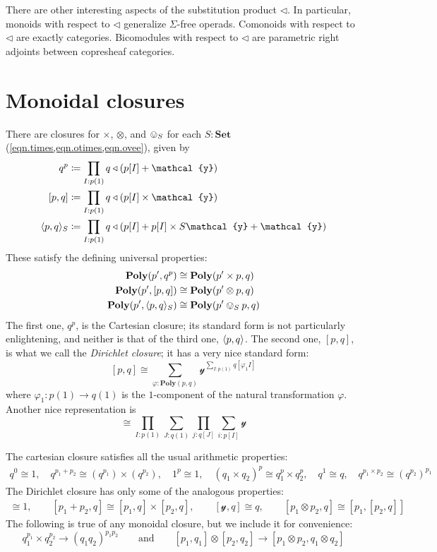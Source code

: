 \documentclass[11pt, one side, article]{memoir}
\theoremstyle{definition}
\theoremstyle{plain}
\DeclarePairedDelimiter{\present}{\langle}{\rangle}
\newcommand{\Cat}[1]{\mathbf{#1}}%
\newcommand{\smset}{\Cat{Set}}
\newcommand{\yon}{\mathcal{y}}
\newcommand{\poly}{\Cat{Poly}}
\newcommand{\0}{\textsf{0}}
\newcommand{\1}{\tn{\textsf{1}}}
\newcommand{\tri}{\mathbin{\triangleleft}}
\newcommand{\qqand}{\qquad\text{and}\qquad}
\begin{document}
There are other interesting aspects of the substitution product $\tri$. In particular, monoids with respect to $\tri$ generalize $\Sigma$-free operads. Comonoids with respect to $\tri$ are exactly categories. Bicomodules with respect to $\tri$ are parametric right adjoints between copresheaf categories.

\chapter{Monoidal closures}

There are closures for $\times$, $\otimes$, and $\ovee_S$ for each $S:\smset$ (\cref{eqn.times,eqn.otimes,eqn.ovee}),%
given by
\begin{align}
  q^p&\coloneqq \prod_{I: p(1)}q\tri(p[I]+\yon)\label{eqn.cart_cl}\\
  [p,q]&\coloneqq\prod_{I: p(1)}q\tri(p[I]\times\yon)\\
  \present{p,q}_S&\coloneqq\prod_{I: p(1)}q\tri(p[I]+p[I]\times S\yon+\yon)
\end{align}
These satisfy the defining universal properties:
\begin{align}
  \poly(p',q^p)&\cong\poly(p'\times p,q)\\
  \poly(p',[p,q])&\cong\poly(p'\otimes p,q)\\
  \poly(p',\present{p,q}_S)&\cong\poly(p'\ovee_S p,q)
\end{align}
The first one, $q^p$, is the Cartesian closure; its standard form is not particularly enlightening, and neither is that of the third one, $\present{p,q}$. The second one, $[p,q]$, is what we call the \emph{Dirichlet closure}; it has a very nice standard form:
\[
[p,q]\cong\sum_{\varphi:\poly(p,q)}\yon^{\sum\limits_{I: p(1)}q[\varphi_1I]}
\]
where $\varphi_1\colon p(1)\to q(1)$ is the $1$-component of the natural transformation $\varphi$. Another nice representation is
\begin{equation}
[p,q]\cong\prod_{I: p(1)}\sum_{J: q(1)}\prod_{j: q[J]}\sum_{i: p[I]}\yon
\end{equation}

The cartesian closure satisfies all the usual arithmetic properties:
\begin{gather}
	q^0\cong1,\quad
	q^{p_1+p_2}\cong (q^{p_1})\times(q^{p_2}),\quad
	1^p\cong 1,\quad
	(q_1\times q_2)^p\cong q_1^p\times q_2^p,\quad
	q^1\cong q,\quad
	q^{p_1\times p_2}\cong (q^{p_2})^{p_1}
\end{gather}
The Dirichlet closure has only some of the analogous properties:
\begin{gather}
	[0,p]\cong1,\qquad
	[p_1+p_2,q]\cong [p_1,q]\times[p_2,q],\qquad
	[\yon,q]\cong q,\qquad
	[p_1\otimes p_2,q]\cong[p_1,[p_2,q]]
\end{gather}
The following is true of any monoidal closure, but we include it for convenience:
\begin{equation}
	q_1^{p_1}\times q_2^{p_2}\to (q_1q_2)^{p_1p_2}
	\qqand
	[p_1,q_1]\otimes[p_2,q_2]\to[p_1\otimes p_2,q_1\otimes q_2]
\end{equation}
\end{document}
